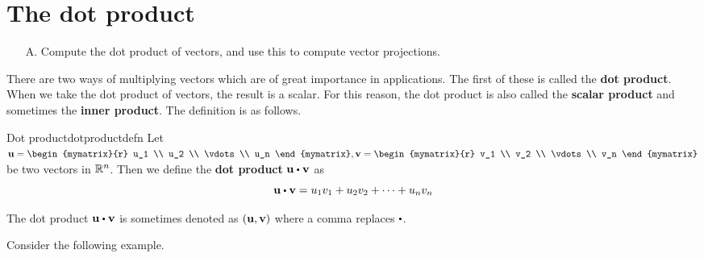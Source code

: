 \section{The dot product}

\begin{outcome}

\begin{enumerate}
\item[A.] Compute the dot product of vectors, and use this to compute vector projections.
\end{enumerate}
\end{outcome}

There are two ways of multiplying vectors which are of great importance in
applications. The first of these is called the \textbf{dot product}. When we take the dot product of vectors, the 
result is a scalar. For this reason, the dot product is also
called the \textbf{scalar product }and sometimes the \textbf{inner product}. The definition is as follows.

\begin{definition}{Dot product}{dotproductdefn}
Let $\vect{u}=\begin{mymatrix}{r}
u_1 \\
u_2 \\
\vdots \\
u_n 
\end{mymatrix} ,\vect{v}= \begin{mymatrix}{r}
v_1 \\
v_2 \\
\vdots \\
v_n 
\end{mymatrix}$ be two vectors in $\mathbb{R}^{n}$. Then we
define the \textbf{dot product}  $\vect{u}\dotprod \vect{v}$ as
\begin{equation*}
\vect{u}\dotprod \vect{v} = u_1v_1+u_2v_2+\cdots+u_nv_n
\end{equation*}
\end{definition}

The dot product $\vect{u}\dotprod \vect{v}$ is sometimes denoted as $({\bf u},{\bf v})$ where a comma replaces $\dotprod $.

Consider the following example.

